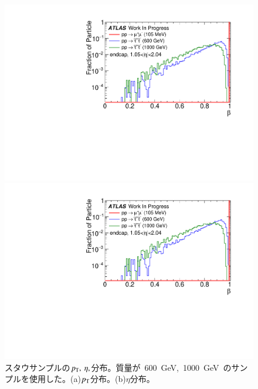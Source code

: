 \begin{figure}[tbp]
    \begin{minipage}{0.49\hsize}
    \centering   
    \includegraphics[width=\textwidth,page=2]{img/plot/beta.pdf}
    \subcaption{}
    \end{minipage}
    \begin{minipage}{0.49\hsize}
    \centering   
    \includegraphics[width=\textwidth,page=3]{img/plot/beta.pdf}
    \subcaption{}
    \end{minipage}
    \caption[スタウサンプルの$p_{\rm{T}},~\eta,$分布]{スタウサンプルの$p_{\rm{T}},~\eta,$分布。質量が~600~GeV,~1000~GeV~のサンプルを使用した。(a)$p_{\rm{T}}$分布。(b)$\eta$分布。}\label{fig:staud1}
\end{figure}

